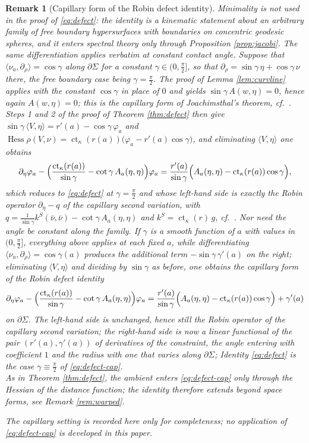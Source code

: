\documentclass[10pt,a4paper]{amsart}
\newtheorem{remark}[theorem]{Remark}
\newcommand{\ct}{\operatorname{ct}_\kappa}
\newcommand{\Hess}{\operatorname{Hess}}
\begin{document}
\begin{remark}[Capillary form of the Robin defect identity]\label{rem:kinematic}
Minimality is not used in the proof of \eqref{eq:defect}: the identity is a kinematic statement about an arbitrary family of free boundary hypersurfaces with boundaries on concentric geodesic spheres, and it enters spectral theory only through Proposition \ref{prop:jacobi}. The same differentiation applies verbatim at constant contact angle. Suppose that $\langle\nu_a,\partial_\rho\rangle=\cos\gamma$ along $\partial\Sigma$ for a constant $\gamma\in(0,\tfrac\pi2]$, so that $\partial_\rho=\sin\gamma\,\eta+\cos\gamma\,\nu$ there, the free boundary case being $\gamma=\tfrac\pi2$. The proof of Lemma \ref{lem:curvline} applies with the constant $\cos\gamma$ in place of $0$ and yields $\sin\gamma\,A(w,\eta)=0$, hence again $A(w,\eta)=0$; this is the capillary form of Joachimsthal's theorem, cf.\ \cite[Lem. 2.5]{NZ1}. Steps 1 and 2 of the proof of Theorem \ref{thm:defect} then give $\sin\gamma\,\langle V,\eta\rangle=r'(a)-\cos\gamma\,\varphi_a$ and $\Hess\rho(V,\nu)=\ct(r(a))\bigl(\varphi_a-r'(a)\cos\gamma\bigr)$, and eliminating $\langle V,\eta\rangle$ one obtains
\[
\partial_\eta\varphi_a-\Bigl(\frac{\ct(r(a))}{\sin\gamma}-\cot\gamma\,A_a(\eta,\eta)\Bigr)\varphi_a=\frac{r'(a)}{\sin\gamma}\Bigl(A_a(\eta,\eta)-\ct(r(a))\cos\gamma\Bigr),
\]
which reduces to \eqref{eq:defect} at $\gamma=\tfrac\pi2$ and whose left-hand side is exactly the Robin operator $\partial_\eta-q$ of the capillary second variation, with $q=\frac{1}{\sin\gamma}k^{S}(\bar\nu,\bar\nu)-\cot\gamma\,A_a(\eta,\eta)$ and $k^{S}=\ct(r)\,g$, cf.\ \cite[\S 2.3]{NZ1}. Nor need the angle be constant along the family. If $\gamma$ is a smooth function of $a$ with values in $(0,\tfrac\pi2]$, everything above applies at each fixed $a$, while differentiating $\langle\nu_a,\partial_\rho\rangle=\cos\gamma(a)$ produces the additional term $-\sin\gamma\,\gamma'(a)$ on the right; eliminating $\langle V,\eta\rangle$ and dividing by $\sin\gamma$ as before, one obtains the \emph{capillary form of the Robin defect identity}
\begin{equation}\label{eq:defect-cap}
\partial_\eta\varphi_a-\Bigl(\frac{\ct(r(a))}{\sin\gamma}-\cot\gamma\,A_a(\eta,\eta)\Bigr)\varphi_a=\frac{r'(a)}{\sin\gamma}\Bigl(A_a(\eta,\eta)-\ct(r(a))\cos\gamma\Bigr)+\gamma'(a)
\end{equation}
on $\partial\Sigma$. The left-hand side is unchanged, hence still the Robin operator of the capillary second variation; the right-hand side is now a linear functional of the pair $(r'(a),\gamma'(a))$ of derivatives of the constraint, the angle entering with coefficient $1$ and the radius with one that varies along $\partial\Sigma$; Identity \eqref{eq:defect} is the case $\gamma\equiv\tfrac\pi2$ of \eqref{eq:defect-cap}.
\\
As in Theorem \ref{thm:defect}, the ambient enters \eqref{eq:defect-cap} only through the Hessian of the distance function; the identity therefore extends beyond space forms, see Remark \ref{rem:warped}.

\noindent The capillary setting is recorded here only for completeness; no application of \eqref{eq:defect-cap} is developed in this paper.
\end{remark}
\end{document}
